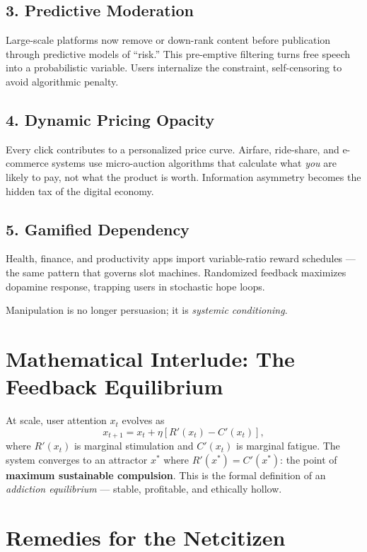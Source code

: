 \documentclass[12pt,twoside]{book}
\begin{document}
\subsection*{3. Predictive Moderation}

Large-scale platforms now remove or down-rank content before publication through predictive models of “risk.”  
This pre-emptive filtering turns free speech into a probabilistic variable.  
Users internalize the constraint, self-censoring to avoid algorithmic penalty.

\subsection*{4. Dynamic Pricing Opacity}

Every click contributes to a personalized price curve.  
Airfare, ride-share, and e-commerce systems use micro-auction algorithms that calculate what \emph{you} are likely to pay, not what the product is worth.  
Information asymmetry becomes the hidden tax of the digital economy.

\subsection*{5. Gamified Dependency}

Health, finance, and productivity apps import variable-ratio reward schedules — the same pattern that governs slot machines.  
Randomized feedback maximizes dopamine response, trapping users in stochastic hope loops.\\

\begin{keyidea}
Manipulation is no longer persuasion; it is \emph{systemic conditioning}.
\end{keyidea}

\section{Mathematical Interlude: The Feedback Equilibrium}

At scale, user attention $x_t$ evolves as
\[
x_{t+1}=x_t+\eta\!\left[R'(x_t)-C'(x_t)\right],
\]
where $R'(x_t)$ is marginal stimulation and $C'(x_t)$ is marginal fatigue.  
The system converges to an attractor $x^*$ where $R'(x^*)=C'(x^*)$: the point of \textbf{maximum sustainable compulsion}.  
This is the formal definition of an \emph{addiction equilibrium} — stable, profitable, and ethically hollow.

\section{Remedies for the Netcitizen}
\end{document}

